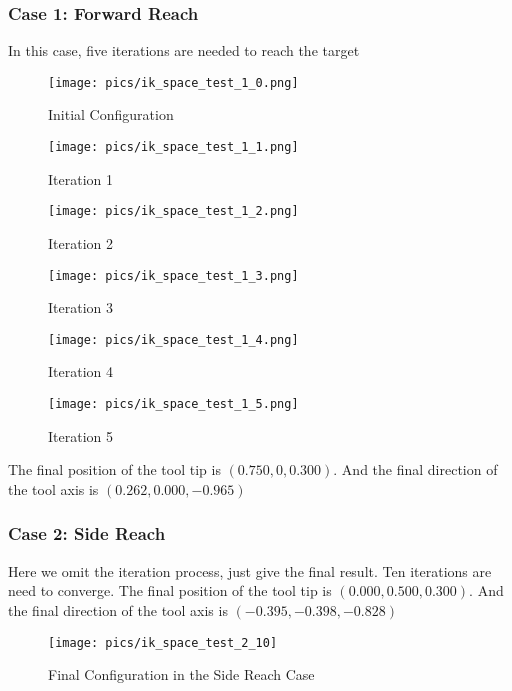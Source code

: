 \documentclass[english,10pt,a4paper]{book}
\begin{document}
		\subsubsection{Case 1: Forward Reach}
		In this case, five iterations are needed to reach the target
		\begin{figure}[H]
			\begin{minipage}{0.33\textwidth}
				\centering
				\texttt{[image: pics/ik\_space\_test\_1\_0.png]}
				\caption{Initial Configuration}
			\end{minipage}
			\begin{minipage}{0.33\textwidth}
				\centering
				\texttt{[image: pics/ik\_space\_test\_1\_1.png]}
				\caption{Iteration 1}
			\end{minipage}
			\begin{minipage}{0.33\textwidth}
				\centering
				\texttt{[image: pics/ik\_space\_test\_1\_2.png]}
				\caption{Iteration 2}
			\end{minipage}
		\end{figure}
		\begin{figure}[H]
			\begin{minipage}{0.33\textwidth}
				\centering
				\texttt{[image: pics/ik\_space\_test\_1\_3.png]}
				\caption{Iteration 3}
			\end{minipage}
			\begin{minipage}{0.33\textwidth}
				\centering
				\texttt{[image: pics/ik\_space\_test\_1\_4.png]}
				\caption{Iteration 4}
			\end{minipage}
			\begin{minipage}{0.33\textwidth}
				\centering
				\texttt{[image: pics/ik\_space\_test\_1\_5.png]}
				\caption{Iteration 5}
			\end{minipage}
		\end{figure}
		The final position of the tool tip is \((0.750, 0, 0.300)\). And the final direction of the tool axis is \((0.262, 0.000, -0.965)\)
		\subsubsection{Case 2: Side Reach}
		Here we omit the iteration process, just give the final result. Ten iterations are need to converge. The final position of the tool tip is \((0.000, 0.500, 0.300)\). And the final direction of the tool axis is \((-0.395, -0.398, -0.828)\)
		\begin{figure}[H]
			\texttt{[image: pics/ik\_space\_test\_2\_10]}
			\caption{Final Configuration in the Side Reach Case}
		\end{figure}
\end{document}
